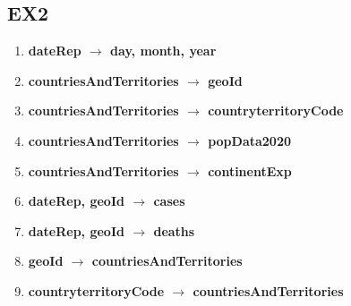 \documentclass{article}
\begin{document}
\subsection{EX2}
\begin{enumerate}
    \item \textbf{\fontsize{11}{13}\selectfont dateRep $\rightarrow$ day, month, year} \\
    \vspace{-\baselineskip}
    \item \textbf{\fontsize{11}{13}\selectfont countriesAndTerritories $\rightarrow$ geoId} \\
    \vspace{-\baselineskip}
    \item \textbf{\fontsize{11}{13}\selectfont countriesAndTerritories $\rightarrow$ countryterritoryCode} \\
    \vspace{-\baselineskip}
    \item \textbf{\fontsize{11}{13}\selectfont countriesAndTerritories $\rightarrow$ popData2020} \\
    \vspace{-\baselineskip}
    \item \textbf{\fontsize{11}{13}\selectfont countriesAndTerritories $\rightarrow$ continentExp} \\
    \vspace{-\baselineskip}
    \item \textbf{\fontsize{11}{13}\selectfont dateRep, geoId $\rightarrow$ cases }\\
    \vspace{-\baselineskip}
    \item \textbf{\fontsize{11}{13}\selectfont dateRep, geoId $\rightarrow$ deaths }\\
    \vspace{-\baselineskip}
    \item \textbf{\fontsize{11}{13}\selectfont geoId $\rightarrow$ countriesAndTerritories }\\
    \vspace{-\baselineskip}
    \item \textbf{\fontsize{11}{13}\selectfont countryterritoryCode $\rightarrow$ countriesAndTerritories }\\
    \vspace{-\baselineskip}
\end{enumerate}
\end{document}
